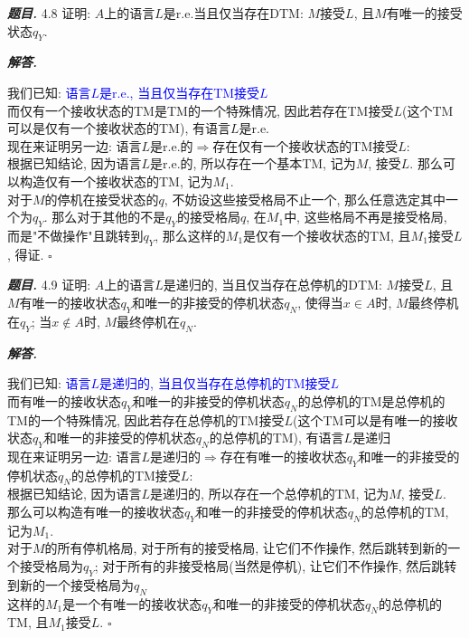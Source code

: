 \documentclass[10pt, a4paper, oneside]{ctexart}
\newenvironment{problem}{\begin{framed}\par\noindent\textbf{\textit{题目. }}}{\end{framed}\par}
\newenvironment{solution}{%
  \par\noindent\textbf{\textit{解答. }}\ignorespaces
}{%
  \hfill\ensuremath{\square}\par %
}
\begin{document}
        \begin{problem}
        4.8 证明: $A$上的语言$L$是r.e.当且仅当存在DTM: $M$接受$L$, 且$M$有唯一的接受状态$q_{Y}$.
        \end{problem}
        \begin{solution}
        我们已知: \textcolor{blue}{语言$L$是r.e., 当且仅当存在TM接受$L$}\\
        而仅有一个接收状态的TM是TM的一个特殊情况, 因此若存在TM接受$L$(这个TM可以是仅有一个接收状态的TM), 有语言$L$是r.e.\\
        现在来证明另一边: 语言$L$是r.e.的$\Rightarrow$存在仅有一个接收状态的TM接受$L$:\\
        根据已知结论, 因为语言$L$是r.e.的, 所以存在一个基本TM, 记为$M$, 接受$L$. 那么可以构造仅有一个接收状态的TM, 记为$M_1$.\\
        对于$M$的停机在接受状态的$q$, 不妨设这些接受格局不止一个, 那么任意选定其中一个为$q_Y$. 那么对于其他的不是$q_Y$的接受格局$q$, 在$M_1$中, 这些格局不再是接受格局, 而是"不做操作"且跳转到$q_Y$, 那么这样的$M_1$是仅有一个接收状态的TM, 且$M_1$接受$L$, 得证.
        \end{solution}
        
        \begin{problem}
        4.9 证明: $A$上的语言$L$是递归的, 当且仅当存在总停机的DTM: $M$接受$L$, 且$M$有唯一的接收状态$q_Y$和唯一的非接受的停机状态$q_N$, 使得当$x\in A$时, $M$最终停机在$q_Y$; 当$x\notin A$时, $M$最终停机在$q_N$.
        \end{problem}
        \begin{solution}
        我们已知: \textcolor{blue}{语言$L$是递归的, 当且仅当存在总停机的TM接受$L$}\\
        而有唯一的接收状态$q_Y$和唯一的非接受的停机状态$q_N$的总停机的TM是总停机的TM的一个特殊情况, 因此若存在总停机的TM接受$L$(这个TM可以是有唯一的接收状态$q_Y$和唯一的非接受的停机状态$q_N$的总停机的TM), 有语言$L$是递归\\
        现在来证明另一边: 语言$L$是递归的$\Rightarrow$存在有唯一的接收状态$q_Y$和唯一的非接受的停机状态$q_N$的总停机的TM接受$L$:\\
        根据已知结论, 因为语言$L$是递归的, 所以存在一个总停机的TM, 记为$M$, 接受$L$. 那么可以构造有唯一的接收状态$q_Y$和唯一的非接受的停机状态$q_N$的总停机的TM, 记为$M_1$.\\
        对于$M$的所有停机格局, 对于所有的接受格局, 让它们不作操作, 然后跳转到新的一个接受格局为$q_Y$; 对于所有的非接受格局(当然是停机), 让它们不作操作, 然后跳转到新的一个接受格局为$q_N$\\
        这样的$M_1$是一个有唯一的接收状态$q_Y$和唯一的非接受的停机状态$q_N$的总停机的TM, 且$M_1$接受$L$.
        \end{solution}        
\end{document}
